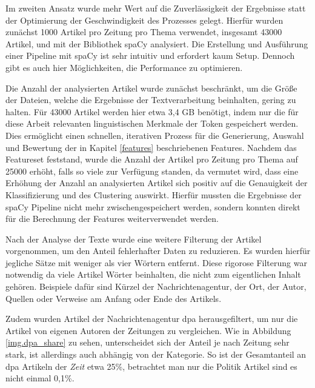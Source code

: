 Im zweiten Ansatz wurde mehr Wert auf die Zuverlässigkeit der Ergebnisse statt der Optimierung der Geschwindigkeit des Prozesses gelegt. Hierfür wurden zunächst 1000 Artikel pro Zeitung pro Thema verwendet, insgesamt 43000 Artikel, und mit der Bibliothek spaCy analysiert. Die Erstellung und Ausführung einer Pipeline mit spaCy ist sehr intuitiv und erfordert kaum Setup. Dennoch gibt es auch hier Möglichkeiten, die Performance zu optimieren.


Die Anzahl der analysierten Artikel wurde zunächst beschränkt, um die Größe der Dateien, welche die Ergebnisse der Textverarbeitung beinhalten, gering zu halten. Für 43000 Artikel werden hier etwa 3,4 GB benötigt, indem nur die für diese Arbeit relevanten linguistischen Merkmale der Token gespeichert werden. Dies ermöglicht einen schnellen, iterativen Prozess für die Generierung, Auswahl und Bewertung der in Kapitel \ref{features} beschriebenen Features. Nachdem das Featureset feststand, wurde die Anzahl der Artikel pro Zeitung pro Thema auf 25000 erhöht, falls so viele zur Verfügung standen, da vermutet wird, dass eine Erhöhung der Anzahl an analysierten Artikel sich positiv auf die Genauigkeit der Klassifizierung und des Clustering auswirkt. Hierfür mussten die Ergebnisse der spaCy Pipeline nicht mehr zwischengespeichert werden, sondern konnten direkt für die Berechnung der Features weiterverwendet werden.

Nach der Analyse der Texte wurde eine weitere Filterung der Artikel vorgenommen, um den Anteil fehlerhafter Daten zu reduzieren. Es wurden hierfür jegliche Sätze mit weniger als vier Wörtern entfernt. Diese rigorose Filterung war notwendig da viele Artikel Wörter beinhalten, die nicht zum eigentlichen Inhalt gehören. Beispiele dafür sind Kürzel der Nachrichtenagentur, der Ort, der Autor, Quellen oder Verweise am Anfang oder Ende des Artikels.


Zudem wurden Artikel der Nachrichtenagentur dpa herausgefiltert, um nur die Artikel von eigenen Autoren der Zeitungen zu vergleichen. Wie in Abbildung \ref{img.dpa_share} zu sehen, unterscheidet sich der Anteil je nach Zeitung sehr stark, ist allerdings auch abhängig von der Kategorie. So ist der Gesamtanteil an dpa Artikeln der \emph{Zeit} etwa 25\%, betrachtet man nur die Politik Artikel sind es nicht einmal 0,1\%.

